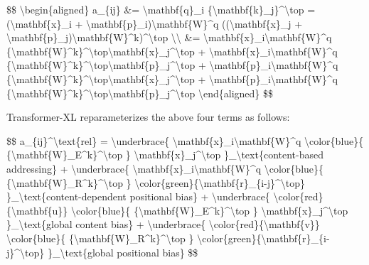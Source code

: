 \$\$ \textbackslash begin\{aligned\} a\_\{ij\} \&= \textbackslash mathbf\{q\}\_i \{\textbackslash mathbf\{k\}\_j\}\^{}\textbackslash top = (\textbackslash mathbf\{x\}\_i + \textbackslash mathbf\{p\}\_i)\textbackslash mathbf\{W\}\^{}q ((\textbackslash mathbf\{x\}\_j + \textbackslash mathbf\{p\}\_j)\textbackslash mathbf\{W\}\^{}k)\^{}\textbackslash top \textbackslash\textbackslash{} \&= \textbackslash mathbf\{x\}\_i\textbackslash mathbf\{W\}\^{}q \{\textbackslash mathbf\{W\}\^{}k\}\^{}\textbackslash top\textbackslash mathbf\{x\}\_j\^{}\textbackslash top + \textbackslash mathbf\{x\}\_i\textbackslash mathbf\{W\}\^{}q \{\textbackslash mathbf\{W\}\^{}k\}\^{}\textbackslash top\textbackslash mathbf\{p\}\_j\^{}\textbackslash top + \textbackslash mathbf\{p\}\_i\textbackslash mathbf\{W\}\^{}q \{\textbackslash mathbf\{W\}\^{}k\}\^{}\textbackslash top\textbackslash mathbf\{x\}\_j\^{}\textbackslash top + \textbackslash mathbf\{p\}\_i\textbackslash mathbf\{W\}\^{}q \{\textbackslash mathbf\{W\}\^{}k\}\^{}\textbackslash top\textbackslash mathbf\{p\}\_j\^{}\textbackslash top \textbackslash end\{aligned\} \$\$

Transformer-XL reparameterizes the above four terms as follows:

\$\$ a\_\{ij\}\^{}\textbackslash text\{rel\} = \textbackslash underbrace\{ \textbackslash mathbf\{x\}\_i\textbackslash mathbf\{W\}\^{}q \textbackslash color\{blue\}\{ \{\textbackslash mathbf\{W\}\_E\^{}k\}\^{}\textbackslash top \} \textbackslash mathbf\{x\}\_j\^{}\textbackslash top \}\_\textbackslash text\{content-based addressing\} + \textbackslash underbrace\{ \textbackslash mathbf\{x\}\_i\textbackslash mathbf\{W\}\^{}q \textbackslash color\{blue\}\{ \{\textbackslash mathbf\{W\}\_R\^{}k\}\^{}\textbackslash top \} \textbackslash color\{green\}\{\textbackslash mathbf\{r\}\_\{i-j\}\^{}\textbackslash top\} \}\_\textbackslash text\{content-dependent positional bias\} + \textbackslash underbrace\{ \textbackslash color\{red\}\{\textbackslash mathbf\{u\}\} \textbackslash color\{blue\}\{ \{\textbackslash mathbf\{W\}\_E\^{}k\}\^{}\textbackslash top \} \textbackslash mathbf\{x\}\_j\^{}\textbackslash top \}\_\textbackslash text\{global content bias\} + \textbackslash underbrace\{ \textbackslash color\{red\}\{\textbackslash mathbf\{v\}\} \textbackslash color\{blue\}\{ \{\textbackslash mathbf\{W\}\_R\^{}k\}\^{}\textbackslash top \} \textbackslash color\{green\}\{\textbackslash mathbf\{r\}\_\{i-j\}\^{}\textbackslash top\} \}\_\textbackslash text\{global positional bias\} \$\$

